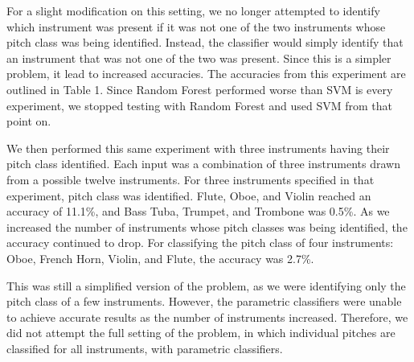 \documentclass{article}
\begin{document}
For a slight modification on this setting, we no longer attempted to identify which instrument was present if it was not one of the two instruments whose pitch class was being identified. Instead, the classifier would simply identify that an instrument that was not one of the two was present. Since this is a simpler problem, it lead to increased accuracies. The accuracies from this experiment are outlined in Table 1. Since Random Forest performed worse than SVM is every experiment, we stopped testing with Random Forest and used SVM from that point on.

We then performed this same experiment with three instruments having their pitch class identified. Each input was a combination of three instruments drawn from a possible twelve instruments. For three instruments specified in that experiment, pitch class was identified. Flute, Oboe, and Violin reached an accuracy of 11.1\%, and Bass Tuba, Trumpet, and Trombone was 0.5\%. As we increased the number of instruments whose pitch classes was being identified, the accuracy continued to drop. For classifying the pitch class of four instruments: Oboe, French Horn, Violin, and Flute, the accuracy was 2.7\%.

This was still a simplified version of the problem, as we were identifying only the pitch class of a few instruments. However, the parametric classifiers were unable to achieve accurate results as the number of instruments increased. Therefore, we did not attempt the full setting of the problem, in which individual pitches are classified for all instruments, with parametric classifiers. 
\end{document}
